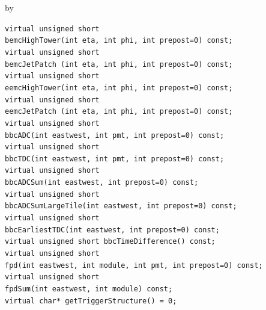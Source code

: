 \documentclass[twoside]{article}
\newcommand{\entrylabel}[1]{\mbox{\textbf{{#1}}}\hfil}%
\newenvironment{entry}
{\begin{list}{}%
    {\renewcommand{\makelabel}{\entrylabel}%
     \setlength{\labelwidth}{90pt}%
     \setlength{\leftmargin}{\labelwidth}
     \advance\leftmargin by \labelsep%
      }%
    }%
  {\end{list}}
\newcommand{\Entrylabel}[1]%
{\raisebox{0pt}[1ex][0pt]{\makebox[\labelwidth][l]%
    {\parbox[t]{\labelwidth}{\hspace{0pt}\textbf{{#1}}}}}}
\newenvironment{Entry}%
{\renewcommand{\entrylabel}{\Entrylabel}\begin{entry}}%
  {\end{entry}}
\begin{document}
\begin{Entry}
    \verb+virtual unsigned short+\\
    \verb+bemcHighTower(int eta, int phi, int prepost=0) const;+\\

    \verb+virtual unsigned short+\\
    \verb+bemcJetPatch (int eta, int phi, int prepost=0) const;+\\

    \verb+virtual unsigned short+\\
    \verb+eemcHighTower(int eta, int phi, int prepost=0) const;+\\

    \verb+virtual unsigned short+\\
    \verb+eemcJetPatch (int eta, int phi, int prepost=0) const;+\\

    \verb+virtual unsigned short+\\
    \verb+bbcADC(int eastwest, int pmt, int prepost=0) const;+\\

    \verb+virtual unsigned short+\\
    \verb+bbcTDC(int eastwest, int pmt, int prepost=0) const;+\\

    \verb+virtual unsigned short+\\
    \verb+bbcADCSum(int eastwest, int prepost=0) const;+\\

    \verb+virtual unsigned short+\\
    \verb+bbcADCSumLargeTile(int eastwest, int prepost=0) const;+\\

    \verb+virtual unsigned short+\\
    \verb+bbcEarliestTDC(int eastwest, int prepost=0) const;+\\

    \verb+virtual unsigned short bbcTimeDifference() const;+\\

    \verb+virtual unsigned short+\\
    \verb+fpd(int eastwest, int module, int pmt, int prepost=0) const; +\\

    \verb+virtual unsigned short+\\
    \verb+fpdSum(int eastwest, int module) const;+\\

    \verb+virtual char* getTriggerStructure() = 0;+\\
\end{Entry}
\clearpage
\end{document}
